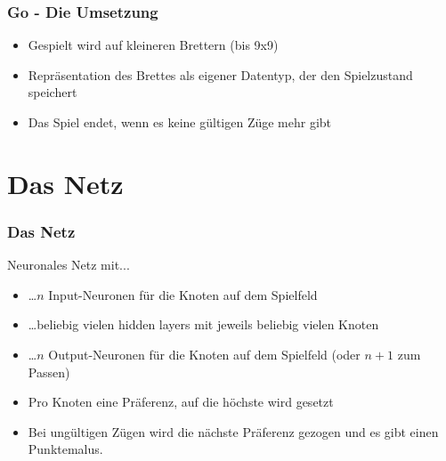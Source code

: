 \documentclass[compress]{beamer}
\begin{document}
\begin{frame}
	\frametitle{Go - Die Umsetzung}
	
	\begin{itemize}
		\item Gespielt wird auf kleineren Brettern (bis 9x9)
		\item Repräsentation des Brettes als eigener Datentyp, der den Spielzustand speichert
		\item Das Spiel endet, wenn es keine gültigen Züge mehr gibt
	\end{itemize}		
	
\end{frame}

\section{Das Netz}

\begin{frame}[fragile]
	\frametitle{Das Netz}

    Neuronales Netz mit...

    \begin{itemize}
        \item \ldots $n$ Input-Neuronen für die Knoten auf dem Spielfeld
        \item \ldots beliebig vielen hidden layers mit jeweils beliebig vielen Knoten
        \item \ldots $n$ Output-Neuronen für die Knoten auf dem Spielfeld (oder $n+1$ zum Passen)
        \item Pro Knoten eine Präferenz, auf die höchste wird gesetzt
        \item Bei ungültigen Zügen wird die nächste Präferenz gezogen und es gibt einen Punktemalus. 
    \end{itemize}

\end{frame}
\end{document}
